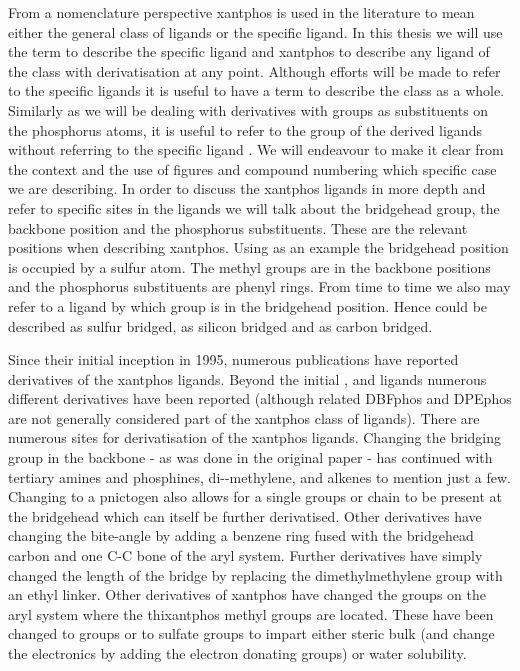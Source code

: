 From a nomenclature perspective xantphos is used in the literature to mean either the general class of ligands or the specific ligand.  In this thesis we will use the term \Phxantphos{} to describe the specific ligand and xantphos to describe any ligand of the class with derivatisation at any point.  Although efforts will be made to refer to the specific ligands it is useful to have a term to describe the class as a whole.  Similarly as we will be dealing with derivatives with \tBu{} groups as substituents on the phosphorus atoms, it is useful to refer to the group of the \tBu{} derived ligands without referring to the specific ligand \tBuxantphos{}.  We will endeavour to make it clear from the context and the use of figures and  compound numbering which specific case we are describing.  In order to discuss the xantphos ligands in more depth and refer to specific sites in the ligands we will talk about the bridgehead group, the backbone position and the phosphorus substituents.  These are the relevant positions when describing xantphos.  Using \Phthixantphos{} as an example the bridgehead position is occupied by a sulfur atom.  The methyl groups are in the backbone positions and the phosphorus substituents are phenyl rings.  From time to time we also may refer to a ligand by which group is in the bridgehead position.  Hence \Phthixantphos{} could be described as sulfur bridged, \Phsixantphos{} as silicon bridged and \Phxantphos{} as carbon bridged.  

Since their initial inception in 1995, numerous publications have reported derivatives of the xantphos ligands.  Beyond the initial \Phsixantphos, \Phthixantphos{} and \Phxantphos ligands numerous different derivatives have been reported (although related DBFphos and DPEphos are not generally considered part of the xantphos class of ligands).  There are numerous sites for derivatisation of the xantphos ligands.  Changing the bridging group in the backbone - as was done in the original paper - has continued with tertiary amines and phosphines, di-\tBu-methylene, and alkenes to mention just a few.  Changing to a pnictogen also allows for a single groups or chain to be present at the bridgehead which can itself be further derivatised.  Other derivatives have changing the bite-angle by adding a benzene ring fused with the bridgehead carbon and one C-C bone of the aryl system.  Further derivatives have simply changed the length of the bridge by replacing the dimethylmethylene group with an ethyl linker.  Other derivatives of xantphos have changed the groups on the aryl system where the thixantphos methyl groups are located.  These have been changed to \tBu{} groups or to sulfate groups to impart either steric bulk (and change the electronics by adding the electron donating groups) or water solubility.  

